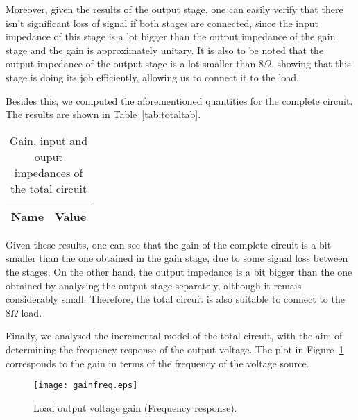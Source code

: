 Moreover, given the results of the output stage, one can easily verify that there isn't significant loss of signal if both stages are connected, since the input impedance of this stage is a lot bigger than the output impedance of the gain stage and the gain is approximately unitary. It is also to be noted that the output impedance of the output stage is a lot smaller than $8\Omega$, showing that this stage is doing its job efficiently, allowing us to connect it to the load.

Besides this, we computed the aforementioned quantities for the complete circuit. The results are shown in Table~\ref{tab:totaltab}.

\begin{table}[H]
  \centering
  \begin{tabular}{|l|r|}
    \hline    
    {\bf Name} & {\bf Value} \\ \hline
    
  \end{tabular}
  \caption{Gain, input and ouput impedances of the total circuit}
  \label{tab:outputdata}
\end{table}

Given these results, one can see that the gain of the complete circuit is a bit smaller than the one obtained in the gain stage, due to some signal loss between the stages. On the other hand, the output impedance is a bit bigger than the one obtained by analysing the output stage separately, although it remais considerably small. Therefore, the total circuit is also suitable to connect to the $8\Omega$ load.

Finally, we analysed the incremental model of the total circuit, with the aim of determining the frequency response of the output voltage. The plot in Figure~\ref{fig:freqresp} corresponds to the gain in terms of the frequency of the voltage source.

\begin{figure}[H] \centering
\texttt{[image: gainfreq.eps]}
\caption{Load output voltage gain (Frequency response).}
\label{fig:freqresp}
\end{figure}
